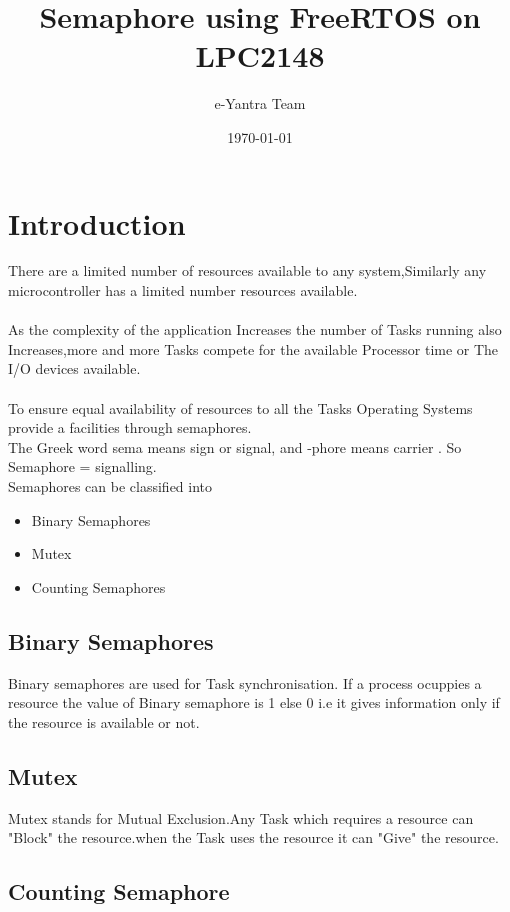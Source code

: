 \documentclass[11pt,a4paper]{article}
\title{Semaphore using FreeRTOS on LPC2148}
\author{e-Yantra Team}
\date{\today}
\begin{document}
	\maketitle
	\newpage
	\tableofcontents
	\newpage
	
	
	\section{Introduction}
	There are a limited number of resources available to any system,Similarly any microcontroller has a limited number  resources available.
	\\ \\
	As the complexity of the application Increases the number of Tasks running also Increases,more and more Tasks compete for the available Processor time or The I/O devices available.
	\\ \\
	To ensure equal availability of resources to all the Tasks Operating Systems provide a facilities through semaphores.
	\\ 
	The Greek word sema means sign or signal, and -phore means carrier . So Semaphore = signalling.
	\\
	Semaphores can be classified into
	\\ 
	\begin{itemize}
	\item Binary Semaphores
	\item Mutex	 
	\item Counting Semaphores
	
	
	\end{itemize}
	\subsection{Binary Semaphores}
	
	Binary semaphores are used for Task synchronisation.
	If a process ocuppies a resource the value of Binary semaphore is 1 else 0 i.e it gives information only if the resource is available or not.
	
	\subsection{Mutex}
	
	Mutex stands for Mutual Exclusion.Any Task which requires a resource can "Block" the resource.when the Task uses the resource it can "Give" the resource.
	
	\subsection{Counting Semaphore}
	
\end{document}
